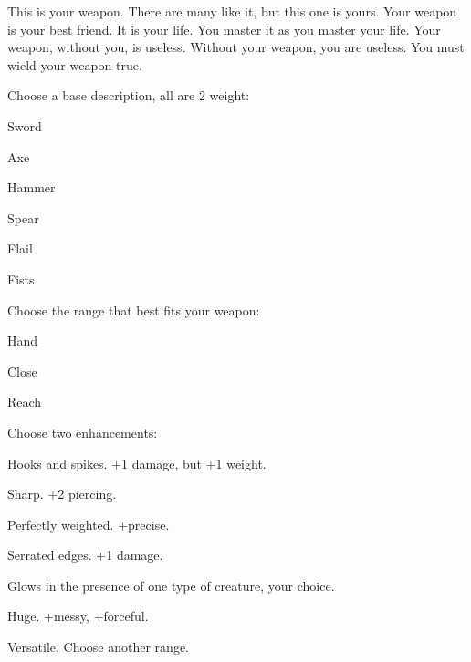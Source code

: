 This is your weapon. There are many like it, but this one is yours. Your weapon is your best friend. It is your life. You master it as you master your life. Your weapon, without you, is useless. Without your weapon, you are useless. You must wield your weapon true.

 

Choose a base description, all are 2 weight:

 
\startitemize[1,packed]

\item Sword

 
\item Axe

 
\item Hammer

 
\item Spear

 
\item Flail

 
\item Fists


\stopitemize
 

Choose the range that best fits your weapon:

 
\startitemize[1,packed]

\item Hand

 
\item Close

 
\item Reach


\stopitemize
 

Choose two enhancements:

 
\startitemize[1,packed]

\item Hooks and spikes. +1 damage, but +1 weight.

 
\item Sharp. +2 piercing.

 
\item Perfectly weighted. +precise.

 
\item Serrated edges. +1 damage.

 
\item Glows in the presence of one type of creature, your choice.

 
\item Huge. +messy, +forceful.

 
\item Versatile. Choose another range.

